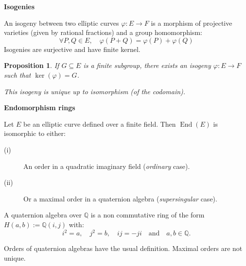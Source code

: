 \documentclass[10pt]{beamer}
\theoremstyle{plain}
\newtheorem{proposition}{Proposition}
\theoremstyle{definition}
\newcommand{\Q}{\mathbb{Q}}
\renewcommand{\(}{\left(}
\renewcommand{\)}{\right)}
\DeclareMathOperator{\End}{End}
\begin{document}
\begin{frame}

\textbf{Isogenies}

\begin{definition}
An isogeny between two elliptic curves $\varphi : E\longrightarrow F$ is a morphism of projective varieties (given by rational fractions) and a group homomorphism:
\[\forall P, Q\in E, \quad \varphi(P+Q)=\varphi(P)+\varphi(Q)\]
Isogenies are surjective and have finite kernel.
\end{definition}

\pause

\begin{proposition}
If $G\subseteq E$ is a finite subgroup, there exists an isogeny $\varphi: E\longrightarrow F$ such that $\ker(\varphi)=G$. 

This isogeny is unique up to isomorphism (of the codomain).
\end{proposition}

\end{frame}

\begin{frame}

\textbf{Endomorphism rings}

\begin{theorem}
Let $E$ be an elliptic curve defined over a finite field. Then $\End(E)$ is isomorphic to either:
\begin{description}
\item[(i)] An order in a quadratic imaginary field (\emph{ordinary} case).
\item[(ii)] Or a maximal order in a quaternion algebra (\emph{supersingular} case).
\end{description}
\end{theorem}

\pause

\begin{definition}
A quaternion algebra over $\Q$ is a non commutative ring of the form $H(a,b):=\Q(i,j)$ with:
\[i^2=a, \quad j^2=b,\quad ij=-ji \quad \mbox{and} \quad a,b\in\Q.\]
\end{definition}

Orders of quaternion algebras have the usual definition. Maximal orders are not unique. 

\end{frame}
\end{document}
